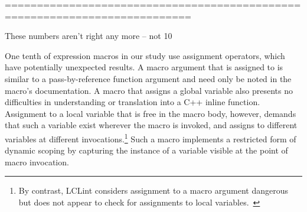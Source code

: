 ===========================================================================

These numbers aren't right any more -- not 10%

One tenth of expression macros in our study use assignment operators, which
have potentially unexpected results.  A macro argument that is assigned to
is similar to a pass-by-reference function argument and need only be noted in the
macro's documentation.  A macro that assigns a global variable also
presents no difficulties in understanding or translation into a C++
inline function.
Assignment to a local variable that is free in the macro body, however,
demands that such a variable exist wherever the macro is invoked, and
assigns to different variables at different invocations.\footnote{By
  contrast, LCLint considers assignment to a macro argument dangerous but
  does not appear to check for assignments to local
  variables.~\cite{Evans:LCLint}} Such a macro implements a restricted form
of dynamic scoping by capturing the instance of a variable visible at
the point of macro invocation.
